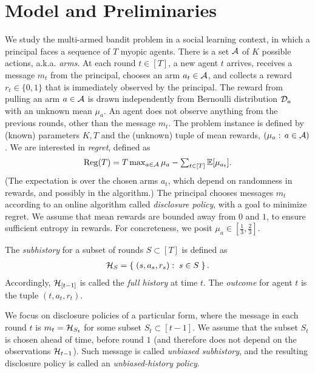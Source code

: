 \section{Model and Preliminaries}
\label{sec:model}
We study the multi-armed bandit problem in a social learning context, in which a principal faces a sequence of $T$ myopic agents. There is a set $\mathcal{A}$ of $K$ possible actions, a.k.a. \emph{arms}. At each round $t\in [T]$, a new agent $t$ arrives, receives a message $m_t$ from the principal, chooses an arm $a_t\in \mathcal{A}$, and collects a reward $r_t\in \{0,1\}$ that is immediately observed by the principal. The reward from pulling an arm $a\in \mathcal{A}$ is drawn independently from Bernoulli distribution $\mathcal{D}_a$ with an unknown mean $\mu_a$. An agent does not observe anything from the previous rounds, other than the message $m_t$. The problem instance is defined by (known) parameters $K,T$ and the (unknown) tuple of mean rewards, $(\mu_a:\,a\in\mathcal{A})$. We are interested in \emph{regret}, defined as
\begin{align}\label{eq:intro-regret-defn}
\textstyle
  \mathrm{Reg}(T)
  = T \max_{a\in \mathcal{A}} \mu_a -
  \sum_{t\in [T]} \mathbb{E}[\mu_{a_t}].
\end{align}
(The expectation is over the chosen arms $a_t$, which depend on randomness in rewards, and possibly in the algorithm.)
The principal chooses messages $m_t$ according to an online algorithm called \emph{disclosure policy}, with a goal to minimize regret. We assume that mean rewards are bounded away from $0$ and $1$, to ensure sufficient entropy in rewards. For concreteness, we posit
    $\mu_a\in [\tfrac13,\tfrac23]$.

The \emph{subhistory} for a subset of rounds $S\subset [T]$ is defined as
\begin{align} \label{eq:model-subhistory}
    \mathcal{H}_{S} = \left\{\; (s,a_s,r_s):\;s\in S \;\right\}.
\end{align}
Accordingly, $\mathcal{H}_{[t-1]}$ is called the \emph{full history} at time $t$.
The \emph{outcome} for agent $t$ is the tuple $(t,a_t,r_t)$.


We focus on disclosure policies of a particular form, where the message in each round $t$ is $m_t = \mathcal{H}_{S_t}$ for some subset $S_t\subset [t-1]$. We assume that the subset $S_t$ is chosen ahead of time, before round $1$ (and therefore does not depend on the observations $\mathcal{H}_{t-1}$). Such message is called \emph{unbiased subhistory}, and the resulting disclosure policy is called an \emph{unbiased-history policy}.


